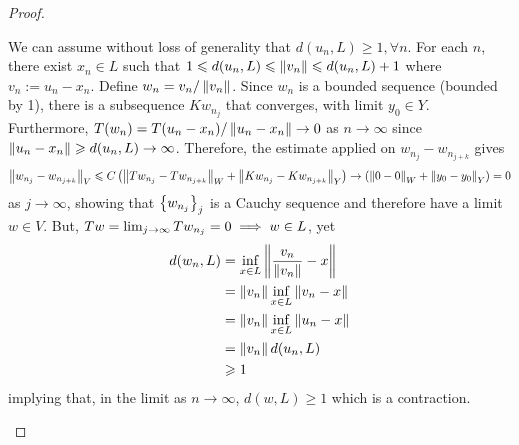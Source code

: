 \documentclass{article}
\begin{document}
\begin{ftheorem}
\begin{proof}
\begin{case} We can assume without loss of generality that $d(u_n, L) \geq 1, \forall n$. For each $n$, there exist $x_n \in L$ such that $1 \leq d(u_n, L) \leq \norm[v_n] \leq d(u_n, L) + 1$ where $v_n := u_n - x_n$. Define $w_n = v_n / \norm[v_n]$. Since $w_n$ is a bounded sequence (bounded by 1), there is a subsequence $Kw_{n_j}$ that converges, with limit $y_0 \in Y$. Furthermore, $T(w_n) = T(u_n - x_n) / \norm[u_n - x_n] \to 0$ as $n \to \infty$ since $\norm[u_n - x_n] \geq d(u_n, L) \to \infty$. Therefore, the estimate applied on $w_{n_j} - w_{n_{j + k}}$ gives
\begin{align*}
\norm[w_{n_j} - w_{n_{j + k}}]_V \leq C \brac{\norm[Tw_{n_j} - Tw_{n_{j + k}}]_W + \norm[Kw_{n_j} - Kw_{n_{j + k}}]_Y} \to  \brac{\norm[0 - 0]_W + \norm[y_0 - y_0]_Y} = 0 
\end{align*}
as $j \to \infty$, showing that $\set{w_{n_j}}_j$ is a Cauchy sequence and therefore have a limit $w \in V$. But, $Tw = \Lim[j] Tw_{n_j} = 0 \implies w \in L$, yet 
\begin{align*}
d(w_n, L) 
&= \inf_{x \in L} \norm[\frac{v_n}{\norm[v_n]} - x] \\
&= \norm[v_n] \inf_{x \in L} \norm[v_n - x] \\
&= \norm[v_n] \inf_{x \in L} \norm[u_n - x] \\
&= \norm[v_n] d(u_n, L) \\
&\geq 1
\end{align*}
implying that, in the limit as $n \to \infty$, $d(w, L) \geq 1$ which is a contraction. 
\end{case}




\end{proof}
\end{ftheorem}





\end{document}
